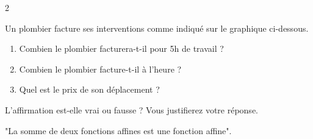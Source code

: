 \documentclass[10pt,a4paper]{article}
\begin{document}
\begin{multicols}{2}
\begin{exo}[][appro]
    Un plombier facture ses interventions comme indiqué sur le graphique ci-dessous.
    
    \begin{enumerate}
        \item Combien le plombier facturera-t-il pour 5h de travail ?
        \item Combien le plombier facture-t-il à l'heure ?
        \item Quel est le prix de son déplacement ?
    \end{enumerate}
\end{exo}


\begin{exo}

    L'affirmation est-elle vrai ou fausse ? Vous justifierez votre réponse.

    "La somme de deux fonctions affines est une fonction affine".
\end{exo}

\end{multicols}
\end{document}
